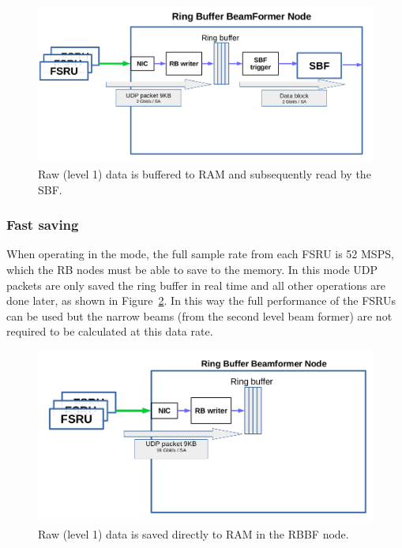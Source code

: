 \documentclass[12pt,a4paper]{article}
\begin{document}
\begin{figure}[h]
\centering
\includegraphics[scale=0.4]{E3DDS_D2_RBBF_Node_fig4.png}
\caption{
Raw (level 1) data is buffered to RAM and subsequently read by the SBF.\label{rb-normal-operations}
}
\end{figure}

\subsubsection{Fast saving}
When operating in the \WBW mode, the full sample rate from each FSRU is 52 MSPS, which the RB nodes must be able to save to the memory. 
In this mode UDP packets are only saved the ring buffer in real time and all other operations are done later, as shown in Figure~\ref{rb-fast-save}. 
In this way the full performance of the FSRUs can be used but the narrow beams (from the second level beam former) are not required to be calculated at this data rate. 
\begin{figure}[h]
\centering
\includegraphics[scale=0.5]{E3DDS_D2_Figure_5.png}
\caption{
Raw (level 1) data is saved directly to RAM in the RBBF node.\label{rb-fast-save}
}
\end{figure}
\end{document}
